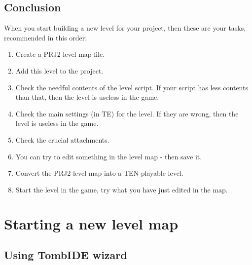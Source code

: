 \section{Conclusion}
When you start building a new level for your project, then these are your tasks, recommended in this order:
\begin{enumerate}
\item Create a PRJ2 level map file.
\item Add this level to the project.
\item Check the needful contents of the level script. If your script has less contents than that, then the level is useless in the game.
\item Check the main settings (in TE) for the level. If they are wrong, then the level is useless in the game.
\item Check the crucial attachments.
\item You can try to edit something in the level map - then save it.
\item Convert the PRJ2 level map into a TEN playable level.
\item Start the level in the game, try what you have just edited in the map.
\end{enumerate} \cite{akyv_tutorial}

\chapter{Starting a new level map}

\section{Using TombIDE wizard}

